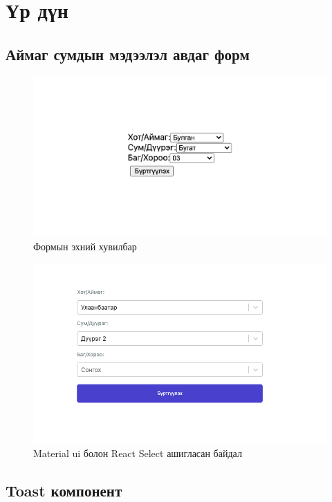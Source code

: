 \section{Үр дүн}
\subsection{Аймаг сумдын мэдээлэл авдаг форм}

\begin{figure}
	\centering
	\includegraphics[width=15cm]{images/form-v1.png}
	\caption{Формын эхний хувилбар}
	\label{fig:form}
\end{figure}

\begin{figure}
	\centering
	\includegraphics[width=15cm]{images/form.png}
	\caption{Material ui болон React Select ашигласан байдал}
	\label{fig:form}
\end{figure}
\pagebreak

\subsection{Toast компонент}

